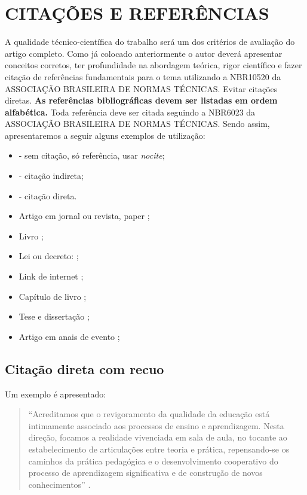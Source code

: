 \documentclass[10pt,brazil,english]{article}
\begin{document}
\section{\uppercase{Citações e referências}}

A qualidade técnico-científica do trabalho será um dos critérios de avaliação do artigo completo. Como já colocado anteriormente o autor deverá apresentar conceitos corretos, ter profundidade na abordagem teórica, rigor científico e fazer citação de referências fundamentais para o tema utilizando a NBR10520 da ASSOCIAÇÃO BRASILEIRA DE NORMAS TÉCNICAS. Evitar citações diretas. \textbf{As referências bibliográficas devem ser listadas em ordem alfabética.} Toda referência deve ser citada seguindo a NBR6023 da ASSOCIAÇÃO BRASILEIRA DE NORMAS TÉCNICAS. Sendo assim, apresentaremos a seguir alguns exemplos de utilização:

\begin{itemize}
\item \nocite{Brasil2002} - sem citação, só referência, usar \textit{nocite{}};
\item \cite{dana2010integral} - citação indireta;
\item {} - citação direta.
\end{itemize}

\begin{itemize}
\item Artigo em jornal ou revista, paper \cite{dana2010integral};
\item Livro \cite{Lima2004};
\item Lei ou decreto: \cite{BrasilEAD2005};
\item Link de internet \cite{Reis2012};
\item Capítulo de livro \cite{Medeiros2005};
\item Tese \cite{Tome2011} e dissertação \cite{Hsia2006};
\item Artigo em anais de evento \cite{Gonzalez2005};
\end{itemize}

\subsection{Citação direta com recuo}

Um exemplo  é apresentado:

\begin{quote} \footnotesize
``Acreditamos que o revigoramento da qualidade da educação está intimamente associado aos processos de ensino e aprendizagem. Nesta direção, focamos a realidade vivenciada em sala de aula, no tocante ao estabelecimento de articulações entre teoria e prática, repensando-se os caminhos da prática pedagógica e o desenvolvimento cooperativo do processo de aprendizagem significativa e de construção de novos conhecimentos'' \cite[p. 254]{santos2011}.
\end{quote}






\end{document}
